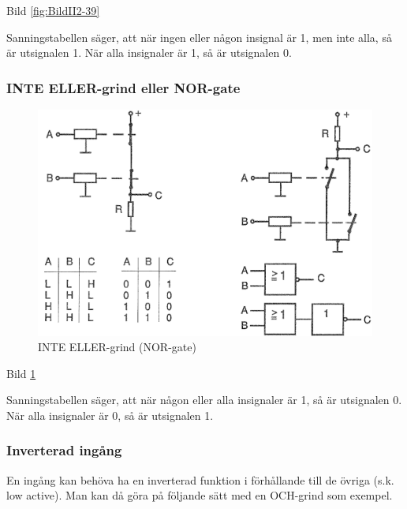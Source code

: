 Bild \ref{fig:BildII2-39}

Sanningstabellen säger, att när ingen eller någon insignal är 1, men inte alla,
så är utsignalen 1. När alla insignaler är 1, så är utsignalen 0.

\subsubsection{INTE ELLER-grind eller NOR-gate}

\begin{figure}
\includegraphics[width=\textwidth]{images/bild_2_2-40.png}
\caption{INTE ELLER-grind (NOR-gate)}
\label{fig:BildII2-40}
\end{figure}

Bild \ref{fig:BildII2-40}

Sanningstabellen säger, att när någon eller alla insignaler är 1, så är
utsignalen 0. När alla insignaler är 0, så är utsignalen 1.

\subsubsection{Inverterad ingång}

En ingång kan behöva ha en inverterad funktion i förhållande till de övriga
(s.k. low active). Man kan då göra på följande sätt med en OCH-grind som
exempel.

